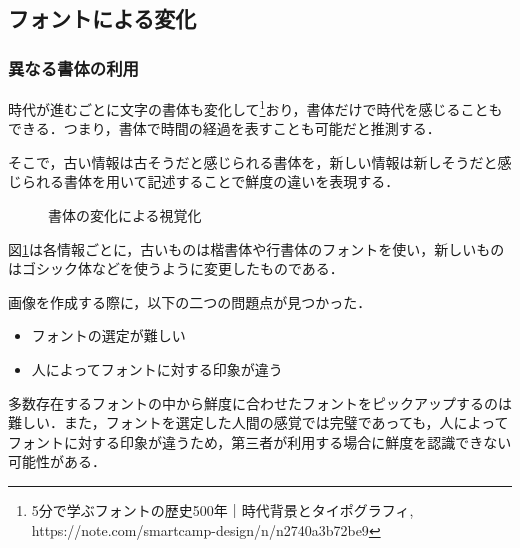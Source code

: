 \subsection{フォントによる変化}
\label{sec:ver-font}

\subsubsection{異なる書体の利用}
\label{subsec:ver-fnt-stl}

時代が進むごとに文字の書体も変化して\footnote{5分で学ぶフォントの歴史500年｜時代背景とタイポグラフィ, https://note.com/smartcamp-design/n/n2740a3b72be9}おり，書体だけで時代を感じることもできる．つまり，書体で時間の経過を表すことも可能だと推測する．

そこで，古い情報は古そうだと感じられる書体を，新しい情報は新しそうだと感じられる書体を用いて記述することで鮮度の違いを表現する．

\begin{figure}[htbp]
  \begin{center}
  \end{center}
  \caption{書体の変化による視覚化}
  \label{fig:ver-style}
\end{figure}

図\ref{fig:ver-style}は各情報ごとに，古いものは楷書体や行書体のフォントを使い，新しいものはゴシック体などを使うように変更したものである．

画像を作成する際に，以下の二つの問題点が見つかった．

\begin{itemize}
  \item フォントの選定が難しい
  \item 人によってフォントに対する印象が違う
\end{itemize}

多数存在するフォントの中から鮮度に合わせたフォントをピックアップするのは難しい．また，フォントを選定した人間の感覚では完璧であっても，人によってフォントに対する印象が違うため，第三者が利用する場合に鮮度を認識できない可能性がある．

